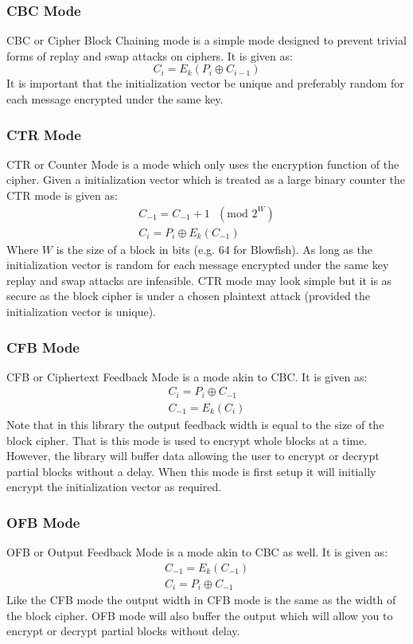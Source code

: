 \documentclass[synpaper]{book}
\begin{document}
\subsubsection{CBC Mode}
CBC or Cipher Block Chaining mode is a simple mode designed to prevent trivial forms of replay and swap attacks on ciphers.
It is given as:
\begin{equation}
C_i = E_k(P_i \oplus C_{i - 1})
\end{equation}
It is important that the initialization vector be unique and preferably random for each message encrypted under the same key.

\subsubsection{CTR Mode}
CTR or Counter Mode is a mode which only uses the encryption function of the cipher.  Given a initialization vector which is
treated as a large binary counter the CTR mode is given as:
\begin{eqnarray}
C_{-1} = C_{-1} + 1\mbox{ }(\mbox{mod }2^W) \nonumber \\
C_i = P_i \oplus E_k(C_{-1})
\end{eqnarray}
Where $W$ is the size of a block in bits (e.g. 64 for Blowfish).  As long as the initialization vector is random for each message
encrypted under the same key replay and swap attacks are infeasible.  CTR mode may look simple but it is as secure
as the block cipher is under a chosen plaintext attack (provided the initialization vector is unique).

\subsubsection{CFB Mode}
CFB or Ciphertext Feedback Mode is a mode akin to CBC.  It is given as:
\begin{eqnarray}
C_i = P_i \oplus C_{-1} \nonumber \\
C_{-1} = E_k(C_i)
\end{eqnarray}
Note that in this library the output feedback width is equal to the size of the block cipher.  That is this mode is used
to encrypt whole blocks at a time.  However, the library will buffer data allowing the user to encrypt or decrypt partial
blocks without a delay.  When this mode is first setup it will initially encrypt the initialization vector as required.

\subsubsection{OFB Mode}
OFB or Output Feedback Mode is a mode akin to CBC as well.  It is given as:
\begin{eqnarray}
C_{-1} = E_k(C_{-1}) \nonumber \\
C_i = P_i \oplus C_{-1}
\end{eqnarray}
Like the CFB mode the output width in CFB mode is the same as the width of the block cipher.  OFB mode will also
buffer the output which will allow you to encrypt or decrypt partial blocks without delay.
\end{document}
